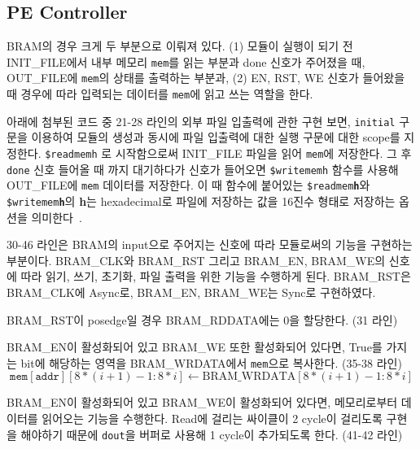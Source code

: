 \documentclass{article}
\newcommand{\orange}[1]{{\color{orange} #1}}
\begin{document}
\subsection{PE Controller}
\orange{
BRAM의 경우 크게 두 부분으로 이뤄져 있다. (1) 모듈이 실행이 되기 전 INIT\_FILE에서 내부 메모리 \texttt{mem}를 읽는 부분과 done 신호가 주어졌을 때, OUT\_FILE에 \texttt{mem}의 상태를 출력하는 부분과, (2) EN, RST, WE 신호가 들어왔을 때 경우에 따라 입력되는 데이터를 \texttt{mem}에 읽고 쓰는 역할을 한다.

\begin{itemize*}
\item 아래에 첨부된 코드 중 21-28 라인의 외부 파일 입출력에 관한 구현 보면, \texttt{initial} 구문을 이용하여 모듈의 생성과 동시에 파일 입출력에 대한 실행 구문에 대한 scope를 지정한다. 
\texttt{\$readmemh} 로 시작함으로써 INIT\_FILE 파일을 읽어 \texttt{mem}에 저장한다. 
그 후 \texttt{done} 신호 들어올 때 까지 대기하다가 신호가 들어오면 \texttt{\$writememh} 함수를 사용해 OUT\_FILE에 \texttt{mem} 데이터를 저장한다.
이 때 함수에 붙어있는 \texttt{\$readmem\textbf{h}}와 \texttt{\$writemem\textbf{h}}의 \textbf{h}는 hexadecimal로 파일에 저장하는 값을 16진수 형태로 저장하는 옵션을 의미한다~\cite{memh}. \\
\item 30-46 라인은 BRAM의 input으로 주어지는 신호에 따라 모듈로써의 기능을 구현하는 부분이다. BRAM\_CLK와 BRAM\_RST 그리고 BRAM\_EN, BRAM\_WE의 신호에 따라 읽기, 쓰기, 초기화, 파일 출력을 위한 기능을 수행하게 된다. BRAM\_RST은 BRAM\_CLK에 Async로, BRAM\_EN, BRAM\_WE는 Sync로 구현하였다.
\begin{itemize*}
\item BRAM\_RST이 posedge일 경우 BRAM\_RDDATA에는 0을 할당한다. (31 라인)
\item BRAM\_EN이 활성화되어 있고 BRAM\_WE 또한 활성화되어 있다면, True를 가지는 bit에 해당하는 영역을 BRAM\_WRDATA에서 \texttt{mem}으로 복사한다. (35-38 라인)
\begin{equation}
\texttt{mem}[ \texttt{addr} ][8*(i+1)-1:8* i ]  \leftarrow \text{BRAM\_WRDATA}[8*(i+1) -1:8* i ] 
\end{equation}
\item BRAM\_EN이 활성화되어 있고 BRAM\_WE이 활성화되어 있다면, 메모리로부터 데이터를 읽어오는 기능을 수행한다. Read에 걸리는 싸이클이 2 cycle이 걸리도록 구현을 해야하기 때문에 \texttt{dout}을 버퍼로 사용해 1 cycle이 추가되도록 한다. (41-42 라인)
\end{itemize*}
\end{itemize*}
}
\end{document}
